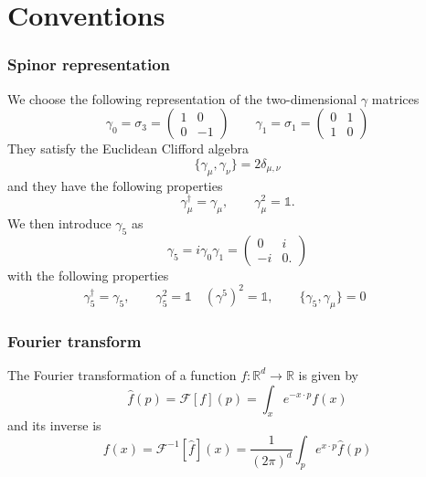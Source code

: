 
\chapter{Conventions} %
\label{chap:AppendixA} %
\subsection*{Spinor representation}
We choose the following representation of the two-dimensional $\gamma$ matrices
\begin{equation*}
        \gamma_0 = \sigma_3 = 
        \begin{pmatrix}
            1 & 0 \\
            0 & -1    
        \end{pmatrix}
        \qquad 
        \gamma_1 = \sigma_1 = 
        \begin{pmatrix}
            0 & 1 \\
            1 & 0    
        \end{pmatrix}
\end{equation*}
They satisfy the Euclidean Clifford algebra
\begin{equation*}
    \{\gamma_\mu, \gamma_\nu\} = 2\delta_{\mu, \nu}
\end{equation*}
and they have the following properties
\begin{equation*}
    \gamma_\mu^{\dagger}=\gamma_\mu, \quad  \quad \gamma_\mu^2=\mathbb{1}.
\end{equation*}
We then introduce $\gamma_5$ as
\begin{equation*}
    \gamma_5 = i \gamma_0 \gamma_1 =
    \begin{pmatrix}
        0 & i \\
        -i & 0. 
    \end{pmatrix}
\end{equation*}
with the following properties
\begin{equation*} 
    \gamma_5^{\dagger}=\gamma_5, \qquad \gamma_5^2=\mathbb{1} \quad
    (\gamma^5)^2 = \mathbb{1}, \qquad \{\gamma_5, \gamma_\mu\} = 0 \qquad 
\end{equation*}



\subsection*{Fourier transform}
The Fourier transformation of a function $f: \mathbb{R}^d \rightarrow \mathbb{R}$ is given by
$$
\hat{f}(p)=\mathcal{F}[f](p)=\int_x e^{-x \cdot p} f(x)
$$
and its inverse is
$$
f(x)=\mathcal{F}^{-1}[\hat{f}](x)=\frac{1}{(2 \pi)^d} \int_p e^{x \cdot p} \hat{f}(p)
$$
